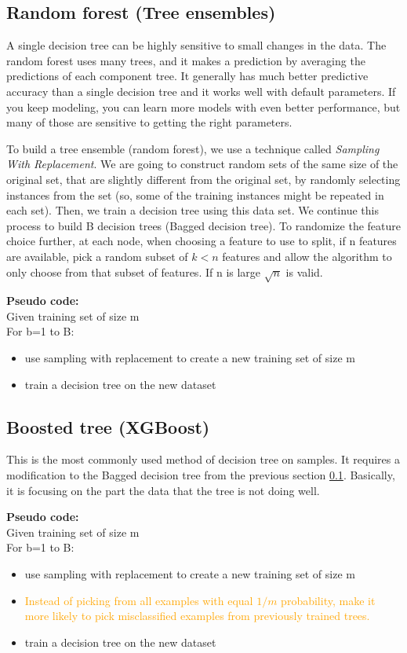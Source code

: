 \documentclass[12pt]{report}
\begin{document}
\subsection{Random forest (Tree ensembles)}
\label{sec:forest}
A single decision tree can be highly sensitive to small changes in the data.
The random forest uses many trees, and it makes a prediction by averaging the predictions of each component tree. It generally has much better predictive accuracy than a single decision tree and it works well with default parameters. If you keep modeling, you can learn more models with even better performance, but many of those are sensitive to getting the right parameters.

To build a tree ensemble (random forest), we use a technique called \textit{Sampling With Replacement}. We are going to construct random sets of the same size of the original set, that are slightly different from the original set, by randomly selecting instances from the set (so, some of the training instances might be repeated in each set). Then, we train a decision tree using this data set. We continue this process to build B decision trees (Bagged decision tree). To randomize the feature choice further, at each node, when choosing a feature to use to split, if n features are available, pick a random subset of $k<n$ features and allow the algorithm to only choose from that subset of features. If n is large $\sqrt{n}$ is valid.

\textbf{Pseudo code:} \\
Given training set of size m \\
For b=1 to B:
\begin{itemize}
  \item use sampling with replacement to create a new training set of size m
  \item train a decision tree on the new dataset
\end{itemize}

\subsection{Boosted tree (XGBoost)}
This is the most commonly used method of decision tree on samples. It requires a modification to the Bagged decision tree from the previous section \ref{sec:forest}. Basically, it is focusing on the part the data that the tree is not doing well.

\textbf{Pseudo code:}\\
Given training set of size m\\
For b=1 to B:
\begin{itemize}
  \item use sampling with replacement to create a new training set of size m
  \item \textcolor{orange}{Instead of picking from all examples with equal $1/m$ probability, make it more likely to pick misclassified examples from previously trained trees.}
  \item train a decision tree on the new dataset
\end{itemize}
\end{document}
